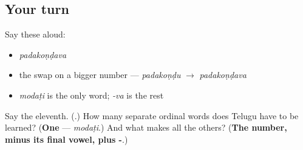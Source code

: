 \subsection*{Your turn}
Say these aloud:

\begin{itemize}
\raggedright
  \item \emph{padakoṇḍava}
  \item the swap on a bigger number — \emph{padakoṇḍu} $\to$ \emph{padakoṇḍava}
  \item \emph{modaṭi} is the only word; \emph{-va} is the rest
\end{itemize}

\begin{tcolorbox}[breakable,colback=teal!4,colframe=teal!35!black,title={Before you move on}]
Say the eleventh. (\textbf{}.) How many separate ordinal words does Telugu have to be learned? (\textbf{One} — \emph{modaṭi}.) And what makes all the others? (\textbf{The number, minus its final vowel, plus -}.)
\end{tcolorbox}
